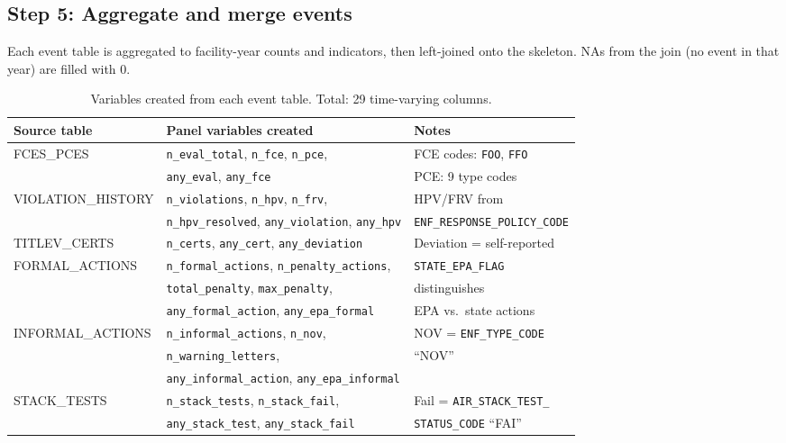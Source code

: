 \documentclass[11pt]{article}
\begin{document}
\subsection{Step 5: Aggregate and merge events}

Each event table is aggregated to facility-year counts and indicators, then left-joined onto the skeleton. NAs from the join (no event in that year) are filled with 0.

\begin{table}[H]
\centering
\begin{tabular}{lll}
\toprule
Source table & Panel variables created & Notes \\
\midrule
FCES\_PCES & \texttt{n\_eval\_total}, \texttt{n\_fce}, \texttt{n\_pce}, & FCE codes: \texttt{FOO}, \texttt{FFO} \\
 & \texttt{any\_eval}, \texttt{any\_fce} & PCE: 9 type codes \\
\addlinespace
VIOLATION\_HISTORY & \texttt{n\_violations}, \texttt{n\_hpv}, \texttt{n\_frv}, & HPV/FRV from \\
 & \texttt{n\_hpv\_resolved}, \texttt{any\_violation}, \texttt{any\_hpv} & \texttt{ENF\_RESPONSE\_POLICY\_CODE} \\
\addlinespace
TITLEV\_CERTS & \texttt{n\_certs}, \texttt{any\_cert}, \texttt{any\_deviation} & Deviation = self-reported \\
\addlinespace
FORMAL\_ACTIONS & \texttt{n\_formal\_actions}, \texttt{n\_penalty\_actions}, & \texttt{STATE\_EPA\_FLAG} \\
 & \texttt{total\_penalty}, \texttt{max\_penalty}, & distinguishes \\
 & \texttt{any\_formal\_action}, \texttt{any\_epa\_formal} & EPA vs.\ state actions \\
\addlinespace
INFORMAL\_ACTIONS & \texttt{n\_informal\_actions}, \texttt{n\_nov}, & NOV = \texttt{ENF\_TYPE\_CODE} \\
 & \texttt{n\_warning\_letters}, & ``NOV'' \\
 & \texttt{any\_informal\_action}, \texttt{any\_epa\_informal} & \\
\addlinespace
STACK\_TESTS & \texttt{n\_stack\_tests}, \texttt{n\_stack\_fail}, & Fail = \texttt{AIR\_STACK\_TEST\_} \\
 & \texttt{any\_stack\_test}, \texttt{any\_stack\_fail} & \texttt{STATUS\_CODE} ``FAI'' \\
\bottomrule
\end{tabular}
\caption{Variables created from each event table. Total: 29 time-varying columns.}
\end{table}
\end{document}

